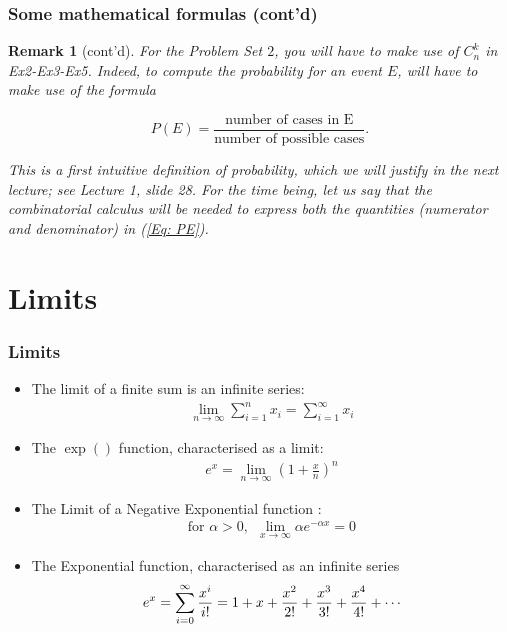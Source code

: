 \documentclass[notes=show,handout]{beamer}\usepackage[]{graphicx}\usepackage[]{color}
\newtheorem{remark}{Remark}[section]
\newcommand{\bea}{\begin{eqnarray}}
\newcommand{\eea}{\end{eqnarray}}
\begin{document}
\begin{frame}
\frametitle{Some mathematical formulas (cont'd)}

\begin{remark} [cont'd]

For the Problem Set $2$, you will have to make use of $C^{k}_n$ in Ex2-Ex3-Ex5. Indeed,
to compute the probability for an event $E$, will have to make use of the formula

\begin{equation} \label{Eq: PE}
P(E)=\dfrac{\text{number of cases in E}}{\text{number of possible cases}}.
\end{equation}

This is a first intuitive definition of probability, which we will justify in the next lecture; see Lecture 1, slide 28. For the time being, let us say that the combinatorial calculus will be needed to express both the quantities (numerator
and denominator) in (\ref{Eq: PE}).



\end{remark}

\end{frame}

\section{Limits}

\begin{frame}
\frametitle{Limits}

\begin{itemize}
\item The limit of a finite sum is an infinite series:
\bea
\lim_{n \to \infty} \sum_{i=1}^n x_i = \sum_{i=1 }^\infty x_i \nonumber
\eea
\item The $\exp()$ function, characterised as a limit:
\bea
e^x = \lim_{n \rightarrow \infty} \left(1 + \frac{x}{n}\right)^n \nonumber
\eea
\item The Limit of a Negative Exponential function :
\bea
\text{for }\alpha >0, \ \  \lim_{x \to \infty} {\alpha e^{-\alpha x}} = 0 \nonumber
\eea
\item The Exponential function, characterised as an infinite series
\bea
e^x = \sum_{i = 0}^{\infty} {x^i \over i!} = 1 + x + {x^2 \over 2!} + {x^3 \over 3!} + {x^4 \over 4!} + \cdots \nonumber
\eea

\end{itemize}
\end{frame}
\end{document}
